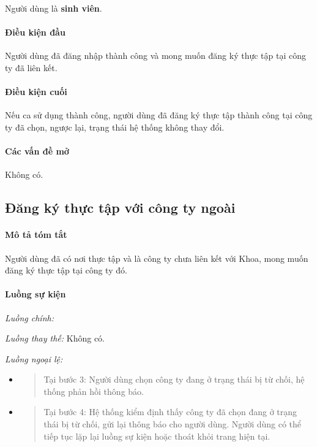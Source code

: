 \documentclass[./../main.tex]{subfiles}
\begin{document}
Người dùng là \textbf{sinh viên}.

\paragraph*{Điều kiện đầu}

Người dùng đã đăng nhập thành công và mong muốn đăng ký thực tập tại
công ty đã liên kết.

\paragraph*{Điều kiện cuối}

Nếu ca sử dụng thành công, người dùng đã đăng ký thực tập thành công tại
công ty đã chọn, ngược lại, trạng thái hệ thống không thay đổi.

\paragraph*{Các vấn đề mở}

Không có.

\subsection{Đăng ký thực tập với công ty ngoài}

\paragraph*{Mô tả tóm tắt}

Người dùng đã có nơi thực tập và là công ty chưa liên kết với Khoa, mong
muốn đăng ký thực tập tại công ty đó.

\paragraph*{Luồng sự kiện}

\emph{Luồng chính:}

\emph{Luồng thay thế:} Không có.

\emph{Luồng ngoại lệ:}

\begin{itemize}
\item
  \begin{quote}
  Tại bước 3: Người dùng chọn công ty đang ở trạng thái bị từ chối, hệ
  thống phản hồi thông báo.
  \end{quote}
\item
  \begin{quote}
  Tại bước 4: Hệ thống kiểm định thấy công ty đã chọn đang ở trạng thái
  bị từ chối, gửi lại thông báo cho người dùng. Người dùng có thể tiếp
  tục lặp lại luồng sự kiện hoặc thoát khỏi trang hiện tại.
  \end{quote}
\end{itemize}
\end{document}
